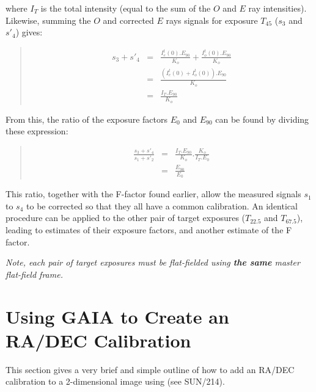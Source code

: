 \documentclass[twoside,11pt]{starlink}
\newenvironment{myquote}{\begin{quote}\begin{small}}{\end{small}\end{quote}}
\begin{document}
where $I_{T}$ is the total intensity (equal to the sum of the $O$ and $E$
ray intensities). Likewise, summing the $O$ and corrected $E$ rays signals
for exposure $T_{45}$ ($s_{3}$ and $s'_{4}$) gives:

\begin{myquote}
\begin{eqnarray*}
   s_{3} + s'_{4} & = & \frac{ I^{t}_{e}(0).E_{90} }{ K_{o} } +
                        \frac{ I^{t}_{o}(0).E_{90} }{ K_{o} } \\
                  & = & \frac{ ( I^{t}_{e}(0) + I^{t}_{o}(0) ).E_{90} }{ K_{o} } \\
                  & = & \frac{ I_{T}.E_{90} }{ K_{o} }
\end{eqnarray*}
\end{myquote}

From this, the ratio of the exposure factors $E_{0}$ and $E_{90}$ can be
found by dividing these expression:

\begin{myquote}
\begin{eqnarray*}
   \frac{ s_{3} + s'_{4} }{ s_{1} + s'_{2} }  & = & \frac{ I_{T}.E_{90} }{ K_{o} }.\frac{ K_{o} }{ I_{T}.E_{0} } \\
                                              & = & \frac{ E_{90} }{ E_{0} }
\end{eqnarray*}
\end{myquote}

This ratio, together with the F-factor found earlier, allow the measured
signals $s_{1}$ to $s_{4}$ to be corrected so that they all have a common
calibration. An identical procedure can be applied to the other pair of
target exposures ($T_{22.5}$ and $T_{67.5}$), leading to estimates of
their exposure factors, and another estimate of the F factor.

\emph{Note, each pair of target exposures must be flat-fielded using
\textbf{the same} master flat-field frame.}

\section{\label{APP:GAIA}Using GAIA to Create an RA/DEC Calibration}
This section gives a very brief and simple outline of how to add an RA/DEC
calibration to a 2-dimensional image using  (see
SUN/214).
\end{document}
